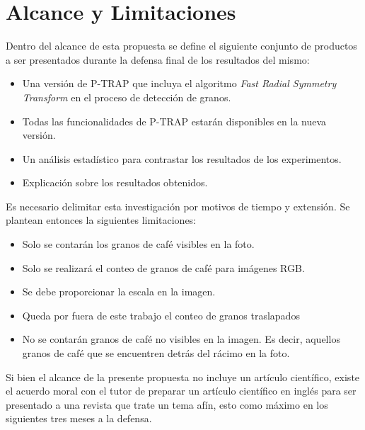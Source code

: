 \section{\textbf{Alcance y Limitaciones}}\label{alcance}
Dentro del alcance de esta propuesta se define el siguiente conjunto de productos a ser presentados durante la defensa final de los resultados del mismo:
\begin{itemize}
\item Una versi\'on de P-TRAP\cite{ptrap} que incluya el algoritmo \textit{Fast Radial Symmetry Transform}\cite{loyzelinsky} en el proceso de detecci\'on de granos.
\item Todas las funcionalidades de P-TRAP\cite{ptrap} estar\'an disponibles en la nueva versi\'on.
\item Un an\'alisis estad\'istico para contrastar los resultados de los experimentos.
\item Explicaci\'on sobre los resultados obtenidos.\\
\end{itemize}
Es necesario delimitar esta investigaci\'on por motivos de tiempo y extensi\'on. Se plantean entonces la siguientes limitaciones:
\begin{itemize}
\item Solo se contar\'an los granos de caf\'e visibles en la foto. 
\item Solo se realizar\'a el conteo de granos de caf\'e para im\'agenes RGB.
\item Se debe proporcionar la escala en la imagen.
\item Queda por fuera de este trabajo el conteo de granos traslapados 
\item No se contar\'an granos de caf\'e no visibles en la imagen. Es decir, aquellos granos de caf\'e que se encuentren detr\'as del r\'acimo en la foto.
\end{itemize}
Si bien el alcance de la presente propuesta no incluye un art\'iculo cient\'ifico, existe el acuerdo moral con el tutor de preparar un art\'iculo cient\'ifico en ingl\'es para ser presentado a una revista que trate un tema af\'in, esto como m\'aximo en los siguientes tres meses a la defensa.